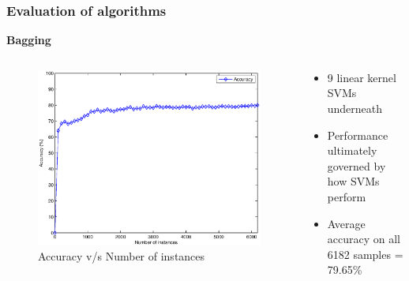 \documentclass[9pt]{beamer}
\begin{document}
    \begin{frame}
        \frametitle{Evaluation of algorithms}
        \begin{center}
            \textbf{Bagging}
        \end{center}
        \begin{columns}
            \begin{column}{0.5\textwidth}
                \begin{figure}
                    \centering
                    \includegraphics[width=\textwidth]{figures/bagging_accuracy.eps}
                    \caption{Accuracy v/s Number of instances}
                \end{figure}
            \end{column}
            \begin{column}{0.5\textwidth}
                \begin{itemize}
                    \item{9 linear kernel SVMs underneath}
                    \item{Performance ultimately governed by how SVMs perform}
                    \item{Average accuracy on all 6182 samples = 79.65\%}
                \end{itemize}
            \end{column}
        \end{columns}
    \end{frame}
    
\end{document}

